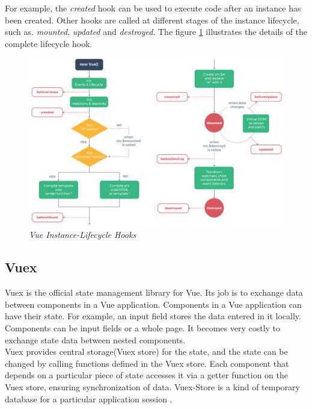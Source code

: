 For example, the \textit{created} hook can be used to execute code after an instance has been created. Other hooks are called at different stages of the instance lifecycle, such as. \textit{mounted}, \textit{updated} and \textit{destroyed}. The figure \ref{fig:OrganisationOfComponents} illustrates the details of the complete lifecycle hook.

\begin{figure}[H]
  \centering
  \includegraphics[width=1\textwidth]{Bilder/img/lifecycle_.png}  
  \caption{ \textit{Vue Instance-Lifecycle Hooks} \cite{InstancVue:Online}}%
\label{fig:OrganisationOfComponents}
\end{figure}



\subsection{Vuex }
\label{sec:Vuex}
Vuex is the official state management library for Vue. Its job is to exchange data between components in a Vue application. Components in a Vue application can have their state. For example, an input field stores the data entered in it locally. Components can be input fields or a whole page. It becomes very costly to exchange state data between nested components.\\

Vuex provides central storage(Vuex store) for the state, and the state can be changed by calling functions defined in the Vuex store.
Each component that depends on a particular piece of state accesses it via a getter function on the Vuex store, ensuring synchronization of data. Vuex-Store is a kind of temporary database for a particular application session \cite{VueGuide:Online}.


